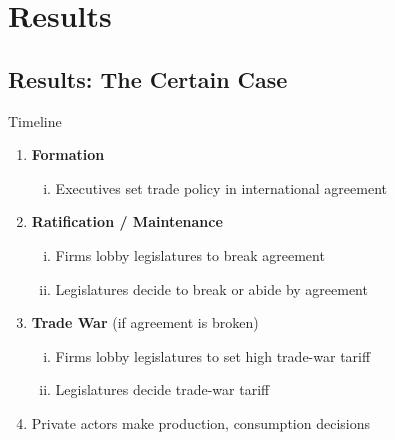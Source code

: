 \documentclass[handout]{beamer}
\begin{document}
\section{Results}
\subsection{Results: The Certain Case}
\begin{frame}{Timeline}
\begin{enumerate}
	\item \textbf{Formation}
		\begin{enumerate}[i.]
			\item Executives set trade policy in international agreement
		\end{enumerate}
	\item \textbf{Ratification / Maintenance}
		\begin{enumerate}[i.]
			\item Firms lobby legislatures to break agreement
			\item Legislatures decide to break or abide by agreement
		\end{enumerate}
	\item {\color{gray} \textbf{Trade War} (if agreement is broken)}
		\begin{enumerate}[i.]
			\item {\color{gray} Firms lobby legislatures to set high trade-war tariff}
			\item {\color{gray} Legislatures decide trade-war tariff}
		\end{enumerate}
	\item {\color{gray} Private actors make production, consumption decisions}
\end{enumerate}
\end{frame}
\end{document}
